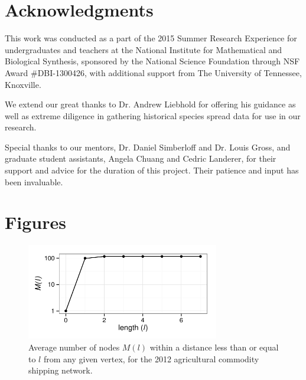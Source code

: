 \documentclass[12pt]{article}
\begin{document}
\section*{Acknowledgments}
This work was conducted as a part of the 2015 Summer Research Experience for undergraduates and teachers at the National Institute for Mathematical and Biological Synthesis, sponsored by the National Science Foundation through NSF Award \#DBI-1300426, with additional support from The University of Tennessee, Knoxville.

We extend our great thanks to Dr. Andrew Liebhold for offering his guidance as well as extreme diligence in gathering historical species spread data for use in our research.

Special thanks to our mentors, Dr. Daniel Simberloff and Dr. Louis Gross, and graduate student assistants, Angela Chuang and Cedric Landerer, for their support and advice for the duration of this project.  Their patience and input has been invaluable. 




\section*{Figures}

\begin{figure}[h]
	\centering
	\includegraphics[width=0.75\textwidth]{length_plot.pdf}
	\caption{Average number of nodes $M(l)$ within a distance less than or equal to $l$ from any given vertex, for the 2012 agricultural commodity shipping network.}
	\label{fig:plot length}
\end{figure}
\end{document}
